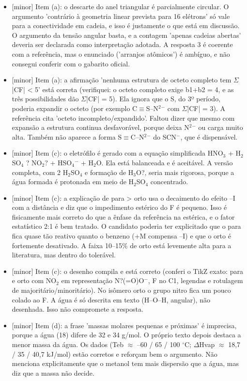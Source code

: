 \documentclass{article}%
\begin{document}
\begin{itemize}%
\item%
{[}minor{]} Item (a): o descarte do anel triangular é parcialmente circular. O argumento 'contrário à geometria linear prevista para 16 elétrons' só vale para a conectividade em cadeia, e isso é justamente o que está em discussão. O argumento da tensão angular basta, e a contagem 'apenas cadeias abertas' deveria ser declarada como interpretação adotada. A resposta 3 é coerente com a referência, mas o enunciado ('arranjos atômicos') é ambíguo, e não consegui conferir com o gabarito oficial.%
\item%
{[}minor{]} Item (a): a afirmação 'nenhuma estrutura de octeto completo tem $\Sigma$|CF| < 5' está correta (verifiquei: o octeto completo exige b1+b2 = 4, e as três possibilidades dão $\Sigma$|CF| = 5). Ela ignora que o S, do 3º período, poderia expandir o octeto (por exemplo C$\equiv$S--N$^2$$^{-}$ com $\Sigma$|CF| = 3). A referência cita 'octeto incompleto/expandido'. Faltou dizer que mesmo com expansão a estrutura continua desfavorável, porque deixa N$^2$$^{-}$ ou carga muito alta. Também não aparece a forma S$\equiv$C--N$^2$$^{-}$ do SCN$^{-}$, que é dispensável.%
\item%
{[}minor{]} Item (c): o eletrófilo é gerado com a equação simplificada HNO$_{3}$ + H$_{2}$SO$_{4}$ ? NO$_{2}$? + HSO$_{4}$$^{-}$ + H$_{2}$O. Ela está balanceada e é aceitável. A versão completa, com 2 H$_{2}$SO$_{4}$ e formação de H$_{3}$O?, seria mais rigorosa, porque a água formada é protonada em meio de H$_{2}$SO$_{4}$ concentrado.%
\item%
{[}minor{]} Item (c): a explicação de para > orto usa o decaimento do efeito --I com a distância e diz que o impedimento estérico do F é pequeno. Isso é fisicamente mais correto do que a ênfase da referência na estérica, e o fator estatístico 2:1 é bem tratado. O candidato poderia ter explicitado que o para fica quase tão reativo quanto o benzeno (+M compensa --I) e que o orto é fortemente desativado. A faixa 10--15\% de orto está levemente alta para a literatura, mas dentro do tolerável.%
\item%
{[}minor{]} Item (c): o desenho compila e está correto (conferi o TikZ exato: para e orto com NO$_{2}$ em representação N?(=O)O$^{-}$, F no C1, legendas e rotulagem de majoritário/minoritário). No isômero orto o grupo nitro fica um pouco colado ao F. A água é só descrita em texto (H--O--H, angular), não desenhada. Isso não compromete a resposta.%
\item%
{[}minor{]} Item (d): a frase 'massas molares pequenas e próximas' é imprecisa, porque a água (18) difere de 32 e 34 g/mol. O próprio texto depois destaca a menor massa da água. Os dados (Teb $\approx$ --60 / 65 / 100 $^\circ$C; $\Delta$Hvap $\approx$ 18,7 / 35 / 40,7 kJ/mol) estão corretos e reforçam bem o argumento. Não menciona explicitamente que o metanol tem mais dispersão que a água, mas diz que a massa não decide.%
\end{itemize}%
\end{document}
